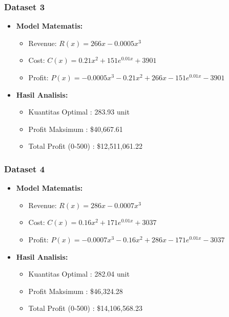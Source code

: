 \documentclass[conference]{IEEEtran}
\begin{document}
\subsubsection{Dataset 3}
\begin{itemize}
    \item \textbf{Model Matematis:}
    \begin{itemize}
        \item Revenue: \( R(x) = 266x - 0.0005x^3 \)
        \item Cost: \( C(x) = 0.21x^2 + 151e^{0.01x} + 3901 \)
        \item Profit: \( P(x) = -0.0005x^3 - 0.21x^2 + 266x - 151e^{0.01x} - 3901 \)
    \end{itemize}
    \item \textbf{Hasil Analisis:}
    \begin{itemize}
        \item Kuantitas Optimal : 283.93 unit
        \item Profit Maksimum  : \$40,667.61
        \item Total Profit (0-500) : \$12,511,061.22
    \end{itemize}
\end{itemize}

\subsubsection{Dataset 4}
\begin{itemize}
    \item \textbf{Model Matematis:}
    \begin{itemize}
        \item Revenue: \( R(x) = 286x - 0.0007x^3 \)
        \item Cost: \( C(x) = 0.16x^2 + 171e^{0.01x} + 3037 \)
        \item Profit: \( P(x) = -0.0007x^3 - 0.16x^2 + 286x - 171e^{0.01x} - 3037 \)
    \end{itemize}
    \item \textbf{Hasil Analisis:}
    \begin{itemize}
        \item Kuantitas Optimal : 282.04 unit
        \item Profit Maksimum  : \$46,324.28
        \item Total Profit (0-500) : \$14,106,568.23
    \end{itemize}
\end{itemize}
\end{document}
